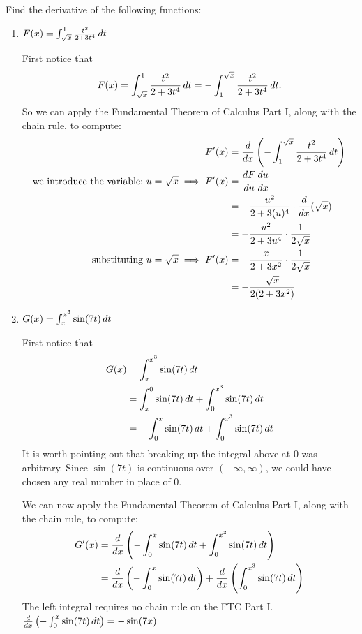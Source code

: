 \documentclass[nooutcomes,handout]{ximera}
\begin{document}
\begin{problem}
  Find the derivative of the following functions:
  \begin{enumerate}
    
  \item  $F(x) = \int_{\sqrt{x}}^1 \frac{t^2}{2 + 3t^4} \,d t$
    \begin{freeResponse}
      First notice that
      $$ F(x) = \int_{\sqrt{x}}^1 \frac{t^2}{2 + 3t^4} \,d t = - \int^{\sqrt{x}}_1 \frac{t^2}{2 + 3t^4} \,d t .$$
      So we can apply the Fundamental Theorem of Calculus Part I, along with the chain rule, to compute:
      \begin{align*}
        F^\prime (x) &= \frac{d}{dx} \left( - \int^{\sqrt{x}}_1 \frac{t^2}{2 + 3t^4} \,d t \right)  \\
       \text{we introduce the variable:}\ u=\sqrt x \implies F'(x)&=\frac{dF}{du}\frac{du}{dx}\\ 
                     &= - \frac{u^2}{2 + 3(u)^4} \cdot \frac{d}{dx}(\sqrt{x})  \\
                     &= - \frac{u^2}{2+3u^4} \cdot \frac{1}{2 \sqrt{x}}  \\
            \text{substituting}\ u=\sqrt x \implies          F^\prime (x) &= - \frac{x}{2+3x^2} \cdot \frac{1}{2 \sqrt{x}}  \\
            		&= - \frac{\sqrt{x}}{2(2+3x^2)}  
      \end{align*}
    \end{freeResponse}
    
    
  \item  $G(x) = \int_x^{x^3} \sin(7t) \,d t$
    \begin{freeResponse}
      First notice that
      \begin{align*}
        G(x) &= \int_x^{x^3} \sin(7t) \,d t  \\
             &= \int_x^0 \sin(7t) \,d t + \int_0^{x^3} \sin(7t) \,d t  \\
             &=  - \int^x_0 \sin(7t) \,d t + \int_0^{x^3} \sin(7t) \,d t
      \end{align*}
      It is worth pointing out that breaking up the integral above at $0$ was arbitrary.  Since $\sin(7t)$ is continuous over $(-\infty, \infty)$, we could have chosen any real number in place of $0$.
      
      We can now apply the Fundamental Theorem of Calculus Part I, along with the chain rule, to compute:
      \begin{align*}
        G^\prime (x) &= \frac{d}{dx} \left( - \int^x_0 \sin(7t) \,d t + \int_0^{x^3} \sin(7t) \,d t \right)  \\
                     &= \frac{d}{dx} \left( - \int^x_0 \sin(7t) \,d t \right) + \frac{d}{dx} \left( \int_0^{x^3} \sin(7t) \,d t \right)  
        \end{align*}
        The left integral requires no chain rule on the FTC Part I.  $ \frac{d}{dx} \left( - \int^x_0 \sin(7t) \,d t \right)=-\sin(7x)\\$
        

\end{freeResponse}
\end{enumerate}
\end{problem}
\end{document}

